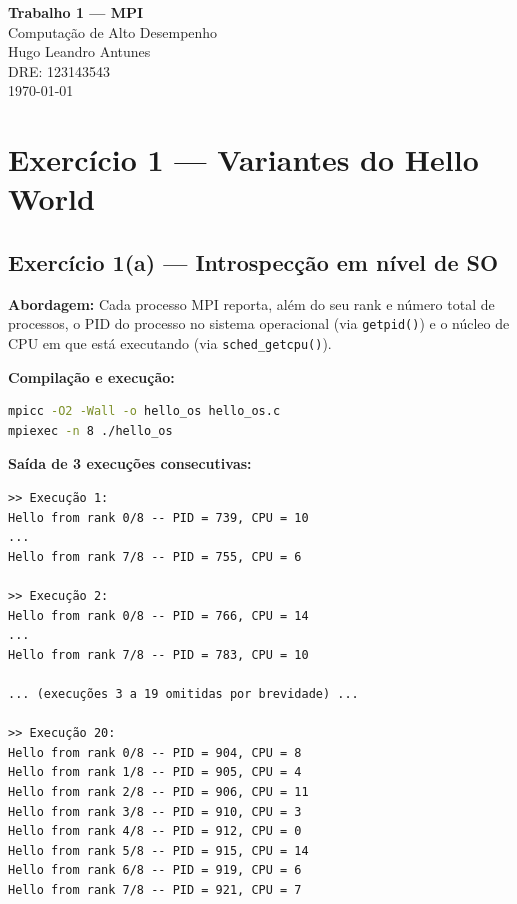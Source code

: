 \documentclass[10pt,small,a4paper]{article}
\begin{document}
\begin{titlepage}
    \centering
    \vspace*{3cm}
    {\Huge\bfseries Trabalho 1 — MPI\\[0.5cm]}
    {\Large Computação de Alto Desempenho}\\[2cm]
    {\Large Hugo Leandro Antunes}\\[0.5cm]
    {\large DRE: 123143543}\\[2cm]
    {\large \today}
    \vfill
\end{titlepage}

\section{Exercício 1 — Variantes do Hello World}

\subsection{Exercício 1(a) — Introspecção em nível de SO}

\textbf{Abordagem:} Cada processo MPI reporta, além do seu rank e número total de
processos, o PID do processo no sistema operacional (via \texttt{getpid()}) e o
núcleo de CPU em que está executando (via \texttt{sched\_getcpu()}).

\textbf{Compilação e execução:}
\begin{lstlisting}[language=bash,numbers=none]
mpicc -O2 -Wall -o hello_os hello_os.c
mpiexec -n 8 ./hello_os
\end{lstlisting}

\textbf{Saída de 3 execuções consecutivas:}

\begin{lstlisting}[language={},numbers=none]
>> Execução 1:
Hello from rank 0/8 -- PID = 739, CPU = 10
...
Hello from rank 7/8 -- PID = 755, CPU = 6

>> Execução 2:
Hello from rank 0/8 -- PID = 766, CPU = 14
...
Hello from rank 7/8 -- PID = 783, CPU = 10

... (execuções 3 a 19 omitidas por brevidade) ...

>> Execução 20:
Hello from rank 0/8 -- PID = 904, CPU = 8
Hello from rank 1/8 -- PID = 905, CPU = 4
Hello from rank 2/8 -- PID = 906, CPU = 11
Hello from rank 3/8 -- PID = 910, CPU = 3
Hello from rank 4/8 -- PID = 912, CPU = 0
Hello from rank 5/8 -- PID = 915, CPU = 14
Hello from rank 6/8 -- PID = 919, CPU = 6
Hello from rank 7/8 -- PID = 921, CPU = 7
\end{lstlisting}
\end{document}
